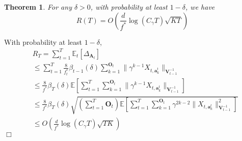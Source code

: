 \documentclass{article}
\newcommand{\bA}{\mathbf{A}}
\newcommand{\ba}{\mathbf{a}}
\newcommand{\bO}{\mathbf{O}}
\newcommand{\bV}{\mathbf{V}}
\newcommand{\EE}{\mathbb{E}}
\newcommand{\norm}[1]{\| #1 \|}
\newtheorem{theorem}{Theorem}[section]
\newenvironment{proof}{\noindent {\textbf{Proof. }}}{$\Box$ \medskip}
\begin{document}
	\begin{theorem}
		For any $\delta > 0$, with probability at least $1 - \delta$, we have
		\begin{equation}
		R(T) = O(\frac{d}{f^*}\log(C_\gamma T)\sqrt{KT})
		\end{equation}
	\end{theorem}
	\begin{proof}
		With probability at least $1-\delta$,
		\begin{equation}
		\begin{split}
		&R_T =\sum_{t=1}^{T} \EE_{t}[\Delta_{\bA_t}] \\
		&\leq \sum_{t=1}^{T} \frac{8}{f_t^*} \beta_{t-1}(\delta)\sum_{k=1}^{\bO_t}\norm{\gamma^{k-1}X_{t,\ba_k^t}}_{\bV_{t-1}^{-1}}\\
		&\leq \frac{8}{f^*}\beta_T(\delta) \EE[\sum_{t=1}^{T} \sum_{k=1}^{\bO_t}\norm{\gamma^{k-1}X_{t,\ba_k^t}}_{\bV_{t-1}^{-1}}]\\
		&\leq \frac{8}{f^*}\beta_T(\delta) \sqrt{(\sum_{t=1}^T\bO_t) \EE[\sum_{t=1}^{T} \sum_{k=1}^{\bO_t}\gamma^{2k-2}\norm{X_{t,\ba_k^t}}_{\bV_{t-1}^{-1}}^2]}\\
		&\leq O(\frac{d}{f^*}\log(C_\gamma T)\sqrt{TK})
		\end{split}
		\end{equation}
	\end{proof}
	
	
	
	
	\nocite{langley00}
	
	
	
	
\end{document}
